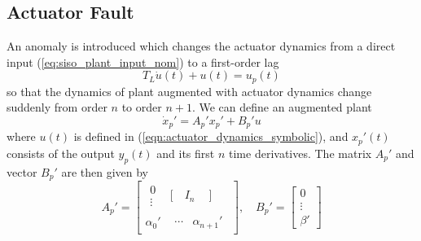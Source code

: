 \subsection{Actuator Fault} \label{subsec:siso_act_fault}
An anomaly is introduced which changes the actuator dynamics from a direct input (\ref{eq:siso_plant_input_nom}) to a first-order lag
\begin{equation}
	T_L\dot{u}(t) + u(t) = u_p(t) \label{eqn:actuator_dynamics_symbolic}
\end{equation} 
\noindent so that the dynamics of plant augmented with actuator dynamics change suddenly from order $n$ to order $n+1$. We can define an augmented plant 
\begin{equation}
	\dot{x}_p' = A_p' x_p' + B_p' u	\label{eqn:plant_3_compact}
\end{equation}
where $u(t)$ is defined in (\ref{eqn:actuator_dynamics_symbolic}), and $x_p'(t)$ consists of the output $y_p(t)$ and its first $n$ time derivatives. The matrix $A_p'$ and vector $B_p'$ are then given by
\begin{equation}
	A_p' = \begin{bmatrix}
		\begin{matrix}0 \\ \vdots \end{matrix} & \Bigg[ \quad I_n \quad ~ \Bigg] \\ \alpha_0' & \begin{matrix}\cdots & \alpha_{n+1}' \end{matrix}
	\end{bmatrix}, \quad B_p' = \begin{bmatrix}
		0 \\ \vdots \\ \beta'
	\end{bmatrix}
	\label{eqn:plant_3_symbolic}
\end{equation}
